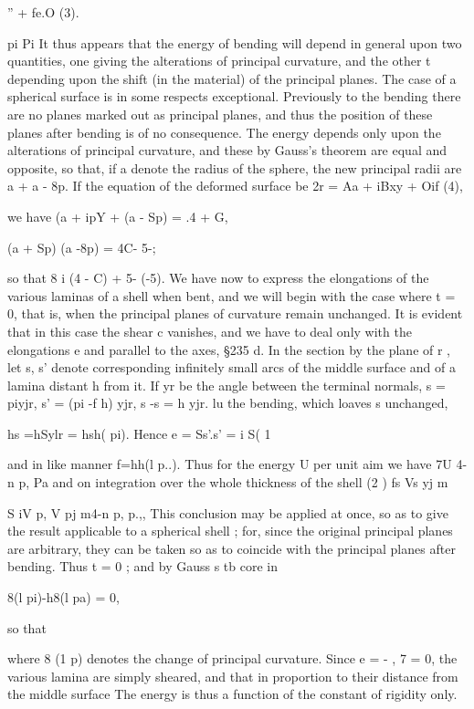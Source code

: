  '' + fe.O (3).

pi Pi It thus appears that the energy of bending will depend in general upon
two quantities, one giving the alterations of principal curvature, and the
other t depending upon the shift (in the material) of the principal planes.
The case of a spherical surface is in some respects exceptional.  Previously to
the bending there are no planes marked out as principal planes, and thus the
position of these planes after bending is of no consequence. The energy depends
only upon the alterations of principal curvature, and these by Gauss's theorem
are equal and opposite, so that, if a denote the radius of the sphere, the new
principal radii are a + a - 8p. If the equation of the deformed surface be 2r =
Aa + iBxy + Oif (4),

we have (a + ipY + (a - Sp) = .4 + G,

(a + Sp) (a -8p) = 4C- 5-;

so that 8 i (4 - C) + 5- (-5).  We have now to express the elongations of the
various laminas of a shell when bent, and we will begin with the case where t =
0, that is, when the principal planes of curvature remain unchanged.  It is
evident that in this case the shear c vanishes, and we have to deal only with
the elongations e and parallel to the axes, §235 d.  In the section by the
plane of r , let s, s' denote corresponding infinitely small arcs of the
middle surface and of a lamina distant h from it. If yr be the angle between
the terminal normals, s = piyjr, s' = (pi -f h) yjr, s -s = h yjr. lu the
bending, which loaves s unchanged,

hs =hSylr = hsh( pi).  Hence e = Ss'.s' = i S( 1

and in like manner f=hh(l p..). Thus for the energy U per unit aim we have 7U
4- n  p, Pa and on integration over the whole thickness of the shell (2 ) fs
Vs yj m

S iV p, V pj m4-n p, p.,, This conclusion may be applied at once, so as to
give the result applicable to a spherical shell ; for, since the original
principal planes are arbitrary, they can be taken so as to coincide with the
principal planes after bending. Thus t = 0 ; and by Gauss s tb core in

8(l pi)-h8(l pa) = 0,

so that

where 8 (1 p) denotes the change of principal curvature. Since e = - , 7 = 0,
the various lamina are simply sheared, and that in proportion to their
distance from the middle surface The energy is thus a function of the constant
of rigidity only.

